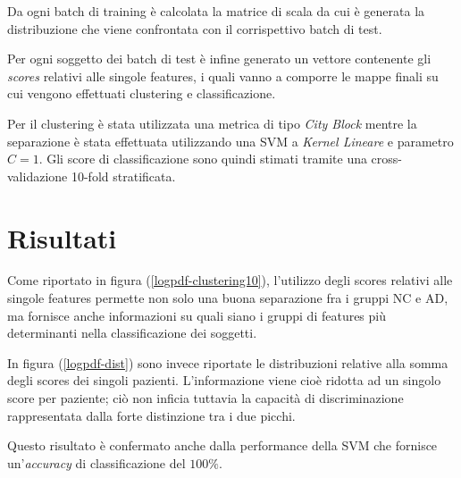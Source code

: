 \documentclass[12pt,openright,a4paper]{article}
\begin{document}
Da ogni batch di training è calcolata la matrice di scala da cui è generata la distribuzione che viene confrontata con il corrispettivo batch di test.

Per ogni soggetto dei batch di test è infine generato un vettore contenente gli \textit{scores} relativi alle singole features, i quali vanno a comporre le mappe finali su cui vengono effettuati clustering e classificazione.

Per il clustering è stata utilizzata una metrica di tipo \textit{City Block} mentre la separazione è stata effettuata utilizzando una SVM a \textit{Kernel Lineare} e parametro $C=1$. Gli score di classificazione sono quindi stimati tramite una cross-validazione 10-fold stratificata.

\section{Risultati}

Come riportato in figura (\ref{logpdf-clustering10}), l'utilizzo degli scores relativi alle singole features permette non solo una buona separazione fra i gruppi NC e AD, ma fornisce anche informazioni su quali siano i gruppi di features più determinanti nella classificazione dei soggetti.

In figura (\ref{logpdf-dist}) sono invece riportate le distribuzioni relative alla somma degli scores dei singoli pazienti. L'informazione viene cioè ridotta ad un singolo score per paziente; ciò non inficia tuttavia la capacità di discriminazione rappresentata dalla forte distinzione tra i due picchi.

Questo risultato è confermato anche dalla performance della SVM che fornisce un'\textit{accuracy} di classificazione del $100\%$.
\end{document}
